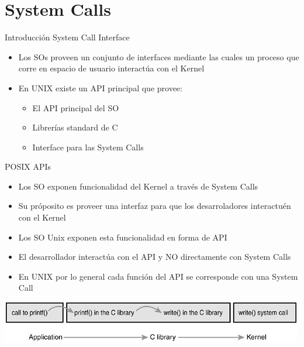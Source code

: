 \section{System Calls}

\begin{frame}{Introducción System Call Interface}
  \begin{itemize}
  \item Los SOs proveen un conjunto de interfaces mediante las cuales un proceso que corre en espacio de usuario interactúa con el Kernel
  \item En UNIX existe un API principal que provee:
  \begin{itemize}
    \item El \alert{API} principal del SO
    \item Librerías standard de C
    \item \alert{Interface para las System Calls}
    \end{itemize} 
  \end{itemize}
\end{frame}

\begin{frame}{POSIX APIs}
  \begin{itemize}
  \item Los SO exponen funcionalidad del Kernel a través de \alert{System Calls} 
  \item Su próposito es proveer una interfaz para que los desarroladores interactuén con el \alert{Kernel}
  \item Los SO Unix exponen esta funcionalidad en forma de \alert{API}
  \item El desarrollador interactúa con el \alert{API} y NO directamente con \alert{System Calls}  
  \item En UNIX por lo general cada función del \alert{API} se corresponde con una \alert{System Call}
  \end{itemize}
  \includegraphics[width=\linewidth]{images/printf.jpg}
\end{frame}


